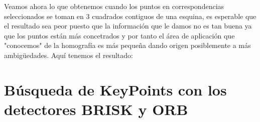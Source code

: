 \documentclass[10pt,a4paper]{article}
\begin{document}
Veamos ahora lo que obtenemos cuando los puntos en correspondencias seleccionados se toman en 3 cuadrados contiguos de una esquina, es esperable que el resultado sea peor puesto que la información que le damos no es tan buena ya que los puntos están más concetrados y por tanto el área de aplicación que "conocemos" de la homografía es más pequeña dando origen posiblemente a más ambigüedades. Aquí tenemos el resultado:\\

\section{Búsqueda de KeyPoints con los detectores BRISK y ORB}
\end{document}
